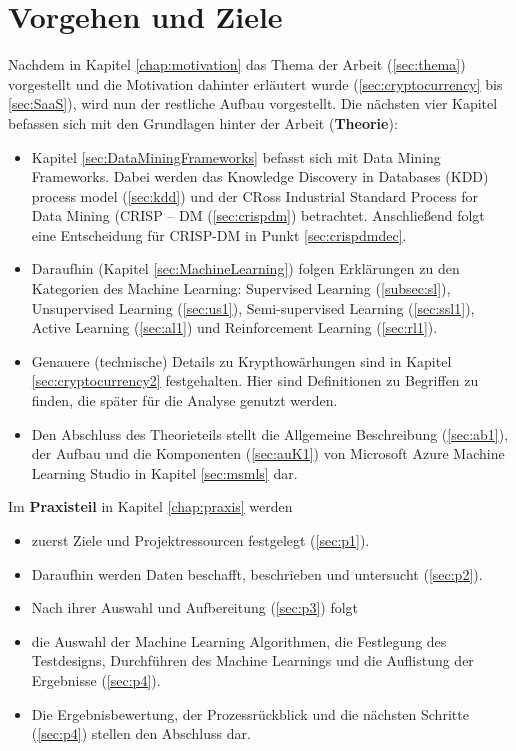 \chapter{Vorgehen und Ziele}\label{chapter:Vorgehen}
Nachdem in Kapitel \ref{chap:motivation} das Thema der Arbeit (\ref{sec:thema}) vorgestellt und die Motivation dahinter erläutert wurde (\ref{sec:cryptocurrency} bis \ref{sec:SaaS}), wird nun der restliche Aufbau vorgestellt.
Die nächsten vier Kapitel befassen sich mit den Grundlagen hinter der Arbeit (\textbf{Theorie}): 
\begin{itemize}
\item Kapitel \ref{sec:DataMiningFrameworks} befasst sich mit Data Mining Frameworks. Dabei werden das Knowledge Discovery in Databases (KDD) process model (\ref{sec:kdd}) und der CRoss Industrial Standard Process for Data Mining (CRISP – DM (\ref{sec:crispdm}) betrachtet. Anschließend folgt eine Entscheidung für CRISP-DM in Punkt \ref{sec:crispdmdec}.
\item Daraufhin (Kapitel \ref{sec:MachineLearning}) folgen Erklärungen zu den Kategorien des Machine Learning: Supervised Learning (\ref{subsec:sl}), Unsupervised Learning (\ref{sec:us1}), Semi-supervised Learning (\ref{sec:ssl1}), Active Learning (\ref{sec:al1}) und Reinforcement Learning (\ref{sec:rl1}).
\item Genauere (technische) Details zu Krypthowärhungen sind in Kapitel \ref{sec:cryptocurrency2} festgehalten. Hier sind Definitionen zu Begriffen zu finden, die später für die Analyse genutzt werden.
\item Den Abschluss des Theorieteils stellt die Allgemeine Beschreibung (\ref{sec:ab1}), der Aufbau und die Komponenten (\ref{sec:auK1}) von Microsoft Azure Machine Learning Studio in Kapitel \ref{sec:msmls} dar.
\end{itemize}
Im \textbf{Praxisteil} in Kapitel \ref{chap:praxis} werden
\begin{itemize}
\item zuerst Ziele und Projektressourcen festgelegt (\ref{sec:p1}).
\item Daraufhin werden Daten beschafft, beschrieben und untersucht (\ref{sec:p2}).
\item Nach ihrer Auswahl und Aufbereitung (\ref{sec:p3}) folgt
\item die Auswahl der Machine Learning Algorithmen, die Festlegung des Testdesigns, Durchführen des Machine Learnings und die Auflistung der Ergebnisse (\ref{sec:p4}).
\item Die Ergebnisbewertung, der Prozessrückblick und die nächsten Schritte (\ref{sec:p4}) stellen den Abschluss dar.
\end{itemize}
